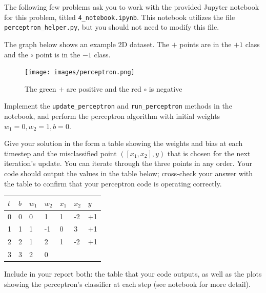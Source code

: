 The following few problems ask you to work with the provided Jupyter notebook for this problem, titled \texttt{4_notebook.ipynb}. This notebook utilizes the file \texttt{perceptron_helper.py}, but you should not need to modify this file.

\begin{problem}[8]
  The graph below shows an example 2D dataset. The $+$ points are in the $+1$ class and the $\circ$ point is in the $-1$ class. 

  \begin{figure}[H]
    \centering
    \texttt{[image: images/perceptron.png]}
    \caption{The green $+$ are positive and the red $\circ$ is negative}
    \label{fig:figure1}
  \end{figure}
  
 Implement the \texttt{update_perceptron} and \texttt{run_perceptron} methods in the notebook, and perform the perceptron algorithm with initial weights $w_1 = 0, w_2 = 1, b = 0$.

  Give your solution in the form a table showing the weights and bias at each timestep and the misclassified point $([x_1,x_2],y)$ that is chosen for the next iteration's update. You can iterate through the three points in any order. Your code should output the values in the table below; cross-check your answer with the table to confirm that your perceptron code is operating correctly.

  \begin{table}[H]
    \centering

    \begin{tabular}{l|lll|ll|l}
    \hline

    \hline
    $t$ & $b$ & $w_1$ & $w_2$ & $x_1$ & $x_2$ & $y$ \\
    \hline
      0  &  0 & 0 & 1  & 1 & -2 & +1\\
      1  &  1 & 1 & -1 & 0 & 3 & +1\\
      2  &  2 & 1 & 2 & 1 & -2 & +1\\
      3  &  3 & 2 & 0 \\
    \hline
    \end{tabular}
  \end{table}
  
  Include in your report both: the table that your code outputs, as well as the plots showing the perceptron's classifier at each step (see notebook for more detail).
  
  
\end{problem}
